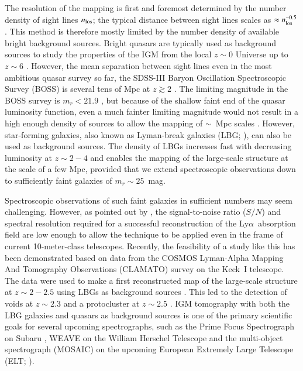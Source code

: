 \documentclass{aa}
\newcommand{\lya}{Ly$\alpha$}
\begin{document}
The resolution of the mapping is first and foremost determined by the number density of sight lines $n_{\rm los}$; the typical distance between sight lines scales as $\approx n_{\rm los}^{-0.5}$. This method is therefore mostly limited by the number density of available bright background sources. Bright quasars are typically used as background sources to study the properties of the IGM from the local $z\sim 0$ Universe up to $z\sim 6$ \citep[e.g.][]{McQuinn2016}. However, the mean separation between sight lines even in the most ambitious quasar survey so far, the SDSS-III Baryon Oscillation Spectroscopic Survey (BOSS)  \citep{Eisenstein2011,Dawson2013} is several tens of Mpc at $z \gtrsim 2$ \citep[e.g.][]{Lee2014a,Ozbek2016}. The limiting magnitude in the BOSS survey is  $m_{r}<21.9$ \citep{Paris2012}, but because of the shallow faint end of the quasar luminosity function, even a much fainter limiting magnitude would not result in a high enough density of sources to allow the mapping of $\sim$~Mpc scales \citep{Lee2014a}. However, star-forming galaxies, also known as Lyman-break galaxies (LBG; \citealt{Steidel1996}), can also be used as background sources. The density of LBGs increases fast with decreasing luminosity at $z \sim 2 - 4$ \citep[e.g.][]{Reddy2009,Alavi2016,Bouwens2015} and enables the mapping of the large-scale structure at the scale of a few Mpc, provided that we extend spectroscopic observations down to sufficiently faint galaxies of $m_{r} \sim 25$~mag.

Spectroscopic observations of such faint galaxies in sufficient numbers may seem challenging. However, as pointed out by \citet{Lee2014a}, the signal-to-noise ratio ($S/N$) and spectral resolution required for a successful reconstruction of the \lya\ absorption field are low enough to allow the technique to be applied even in the frame of current 10-meter-class telescopes. Recently, the feasibility of a study like this has been demonstrated based on data from the COSMOS Lyman-Alpha Mapping And Tomography Observations (CLAMATO) survey \citep{Lee2014b} on the Keck~I telescope. The data were used to make a first reconstructed map of the large-scale structure at $z \sim 2 - 2.5$ using LBGs as background sources \citep{Lee2018}. This led to the detection of voids at $z\sim 2.3$ \citep{krowleski18} and a protocluster at $z \sim 2.5$ \citep{Lee2016}. IGM tomography with both the LBG galaxies  and quasars as background sources is one of the primary scientific goals for several upcoming spectrographs, such as the Prime Focus Spectrograph on Subaru \citep{Takada2014}, WEAVE on the William Herschel Telescope \citep{Pieri2016} and the multi-object spectrograph (MOSAIC) on the upcoming European Extremely Large Telescope (ELT; \citealt{Puech2018}). 
\end{document}
